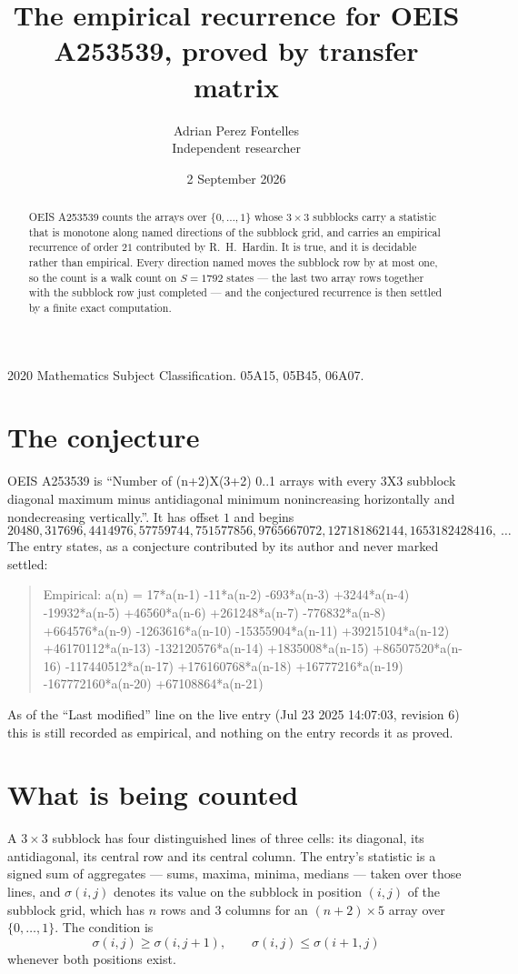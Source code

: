 \documentclass[11pt,a4paper]{article}
\title{The empirical recurrence for OEIS A253539, proved by transfer matrix}
\author{Adrian Perez Fontelles\\ \small Independent researcher}
\date{2 September 2026}
\theoremstyle{plain}
\theoremstyle{definition}
\begin{document}
\maketitle

\begin{abstract}
OEIS A253539 counts the arrays over $\{0,\dots,1\}$ whose $3\times3$ subblocks carry a
statistic that is monotone along named directions of the subblock grid, and carries an
empirical recurrence of order $21$ contributed by R.~H.~Hardin. It is true, and it is
decidable rather than empirical. Every direction named moves the subblock row by at most one,
so the count is a walk count on $S=1792$ states --- the last two array rows together with the
subblock row just completed --- and the conjectured recurrence is then settled by a finite
exact computation.
\end{abstract}

\noindent\small 2020 Mathematics Subject Classification. 05A15, 05B45, 06A07.\normalsize

\section{The conjecture}

OEIS A253539 is ``Number of (n+2)X(3+2) 0..1 arrays with every 3X3 subblock diagonal maximum minus antidiagonal minimum nonincreasing horizontally and nondecreasing vertically.''. It has offset $1$ and begins
\[
20480, 317696, 4414976, 57759744, 751577856, 9765667072, 127181862144, 1653182428416,\ \dots
\]
The entry states, as a conjecture contributed by its author and never marked settled:
\begin{quote}
Empirical: a(n) = 17*a(n-1) -11*a(n-2) -693*a(n-3) +3244*a(n-4) -19932*a(n-5) +46560*a(n-6) +261248*a(n-7) -776832*a(n-8) +664576*a(n-9) -1263616*a(n-10) -15355904*a(n-11) +39215104*a(n-12) +46170112*a(n-13) -132120576*a(n-14) +1835008*a(n-15) +86507520*a(n-16) -117440512*a(n-17) +176160768*a(n-18) +16777216*a(n-19) -167772160*a(n-20) +67108864*a(n-21)
\end{quote}
As of the ``Last modified'' line on the live entry (Jul 23 2025 14:07:03, revision 6) this is still
recorded as empirical, and nothing on the entry records it as proved.

\section{What is being counted}

A $3\times3$ subblock has four distinguished lines of three cells: its diagonal, its
antidiagonal, its central row and its central column. The entry's statistic is a signed sum of
aggregates --- sums, maxima, minima, medians --- taken over those lines, and $\sigma(i,j)$
denotes its value on the subblock in position $(i,j)$ of the subblock grid, which has $n$ rows
and $3$ columns for an $(n+2)\times5$ array over $\{0,\dots,1\}$. The condition is
\[
\sigma(i,j)\ge\sigma(i,j+1),\qquad \sigma(i,j)\le\sigma(i+1,j)
\]
whenever both positions exist.
\end{document}
